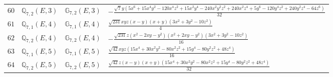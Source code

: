 \documentclass[fleqn,8pt,landscape]{jsarticle}
\begin{document}
\begin{table}[ht!]
\begin{center}
\begin{tabular}{cccl}
$ 60 $ & $ \mathbb{Q}_{7,2}(E,3) $ & $ \mathbb{G}_{7,2}(E,3) $ & $ - \frac{\sqrt{7} y \left(5 x^{6} + 15 x^{4} y^{2} - 120 x^{4} z^{2} + 15 x^{2} y^{4} - 240 x^{2} y^{2} z^{2} + 240 x^{2} z^{4} + 5 y^{6} - 120 y^{4} z^{2} + 240 y^{2} z^{4} - 64 z^{6}\right)}{32} $ \\
$ 61 $ & $ \mathbb{Q}_{7,1}(E,4) $ & $ \mathbb{G}_{7,1}(E,4) $ & $ \frac{\sqrt{231} x y z \left(x - y\right) \left(x + y\right) \left(3 x^{2} + 3 y^{2} - 10 z^{2}\right)}{4} $ \\
$ 62 $ & $ \mathbb{Q}_{7,2}(E,4) $ & $ \mathbb{G}_{7,2}(E,4) $ & $ - \frac{\sqrt{231} z \left(x^{2} - 2 x y - y^{2}\right) \left(x^{2} + 2 x y - y^{2}\right) \left(3 x^{2} + 3 y^{2} - 10 z^{2}\right)}{16} $ \\
$ 63 $ & $ \mathbb{Q}_{7,1}(E,5) $ & $ \mathbb{G}_{7,1}(E,5) $ & $ \frac{\sqrt{42} x y z \left(15 x^{4} + 30 x^{2} y^{2} - 80 x^{2} z^{2} + 15 y^{4} - 80 y^{2} z^{2} + 48 z^{4}\right)}{16} $ \\
$ 64 $ & $ \mathbb{Q}_{7,2}(E,5) $ & $ \mathbb{G}_{7,2}(E,5) $ & $ \frac{\sqrt{42} z \left(x - y\right) \left(x + y\right) \left(15 x^{4} + 30 x^{2} y^{2} - 80 x^{2} z^{2} + 15 y^{4} - 80 y^{2} z^{2} + 48 z^{4}\right)}{32} $ \\
 \hline \hline
\end{tabular}
\end{center}
\end{table}
\end{document}
